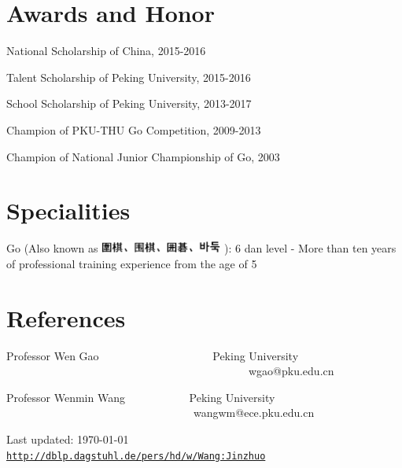 \documentclass[letterpaper]{article}
\def\footerlink{http://dblp.dagstuhl.de/pers/hd/w/Wang:Jinzhuo}
\renewenvironment{itemize}{
  \begin{list}{}{
    \setlength{\leftmargin}{1.5em}
  }
}{
  \end{list}
}
\begin{document}
\section*{Awards and Honor}

\begin{itemize}
    \item National Scholarship of China, 2015-2016
    \item Talent Scholarship of Peking University, 2015-2016
    \item School Scholarship of Peking University, 2013-2017 
    \item Champion of PKU-THU Go Competition, 2009-2013
    \item Champion of National Junior Championship of Go, 2003
\end{itemize}


\section*{Specialities}

\begin{itemize}
    \item Go (Also known as \includegraphics[width=4cm]{gogo.png} ): 6 dan level - More than ten years of professional training experience from the age of 5
\end{itemize}

\section*{References}

\begin{itemize}
    \item   Professor Wen Gao    \ \ \ \ \ \ \ \    \ \ \ \ \ \ \ \   \   \  \  \ Peking University  \ \ \ \ \ \ \ \ \ \ \ \ \ \ \ \ \ \ \ \ \  \ \ \ \ \ \ \ \ \ \ \ \ \ \ \ \ \ \ \ \ \ \ \ wgao@pku.edu.cn
    \item   Professor Wenmin Wang \ \ \ \ \ \ \ \ \ \ \ Peking University  \ \ \ \ \ \ \ \ \ \ \ \ \ \ \ \ \ \ \ \ \ \ \ \ \ \ \ \ \ \ \  \ \ \ wangwm@ece.pku.edu.cn
\end{itemize}


\bigskip
\bigskip

\begin{center}
  \begin{footnotesize}
    Last updated: \today \\
    \href{\footerlink}{\texttt{\footerlink}}
  \end{footnotesize}
\end{center}
\end{document}
